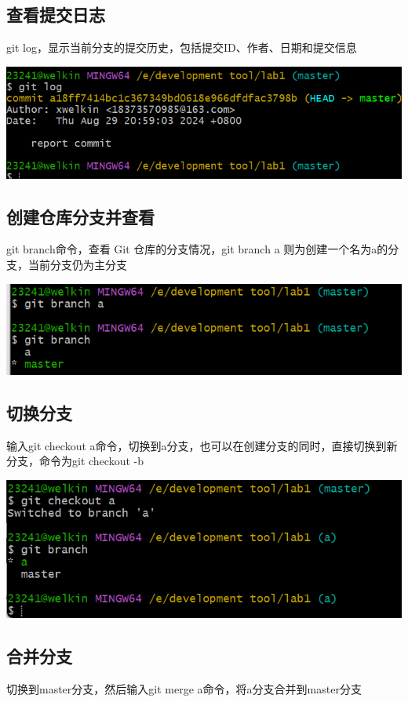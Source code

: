 \documentclass[UTF8,a4paper]{ctexart}
\begin{document}
\begin{sloppypar}
	\subsection{查看提交日志}
	git log，显示当前分支的提交历史，包括提交ID、作者、日期和提交信息
	
	\includegraphics[width = 16cm]{5}
	
	\subsection{创建仓库分支并查看}
	git branch命令，查看 Git 仓库的分支情况，git branch a 则为创建一个名为a的分支，当前分支仍为主分支
	
	\includegraphics[width = 16cm]{6}
	
	\subsection{切换分支}
	输入git checkout a命令，切换到a分支，也可以在创建分支的同时，直接切换到新分支，命令为git checkout -b
	
	\includegraphics[width = 16cm]{7}
	
	\subsection{合并分支}
	切换到master分支，然后输入git merge a命令，将a分支合并到master分支
	

\end{sloppypar}
\end{document}
